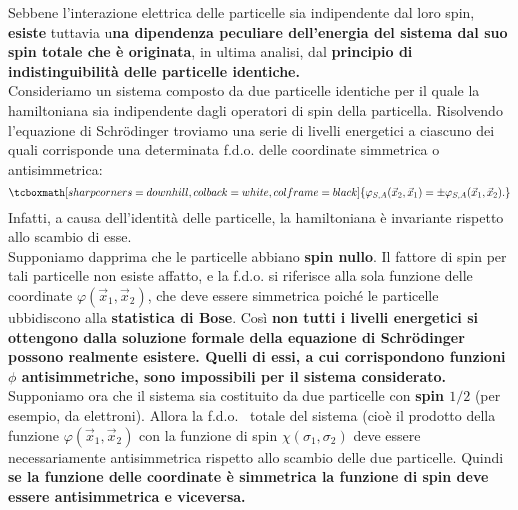 \documentclass[a4paper,12pt,oneside]{book}
\begin{document}
Sebbene l'interazione elettrica delle particelle sia indipendente dal loro spin, \textbf{esiste} tuttavia u\textbf{na dipendenza peculiare dell'energia del sistema dal suo spin totale che è originata}, in ultima analisi, dal \textbf{principio di indistinguibilità delle particelle identiche.}\\

Consideriamo un sistema composto da due particelle identiche per il quale la hamiltoniana sia indipendente dagli operatori di spin della particella. Risolvendo l'equazione di Schr\"{o}dinger troviamo una serie di livelli energetici a ciascuno dei quali corrisponde una determinata f.d.o. delle coordinate simmetrica o antisimmetrica:
	\begin{equation}
		\tcboxmath[sharp corners=downhill, colback=white, colframe=black]{
			\varphi_{S,A}(\vec{x}_2,\vec{x}_1)= \pm \varphi_{S,A}(\vec{x}_1,\vec{x}_2) .
			}
	\end{equation}
Infatti, a causa dell'identità delle particelle, la hamiltoniana è invariante rispetto allo scambio di esse.\\

Supponiamo dapprima che le particelle abbiano \textbf{spin nullo}. Il fattore di spin per tali particelle non esiste affatto, e la f.d.o. si riferisce alla sola funzione delle coordinate $\varphi(\vec{x}_1, \vec{x}_2)$, che deve essere simmetrica poiché le particelle ubbidiscono alla \textbf{statistica di Bose}. Così \textbf{non tutti i livelli energetici si ottengono dalla soluzione formale della equazione di Schr\"{o}dinger possono realmente esistere. Quelli di essi, a cui corrispondono funzioni $\phi$ antisimmetriche, sono impossibili per il sistema considerato.}\\

Supponiamo ora che il sistema sia costituito da due particelle con \textbf{spin $1/2$} (per esempio, da elettroni). Allora la f.d.o.~ totale del sistema (cioè il prodotto della funzione $\varphi(\vec{x}_1,\vec{x}_2)$ con la funzione di spin $\chi(\sigma_1, \sigma_2)$ deve essere necessariamente antisimmetrica rispetto allo scambio delle due particelle. Quindi \textbf{se la funzione delle coordinate è simmetrica la funzione di spin deve essere antisimmetrica e viceversa.}\\
\end{document}
